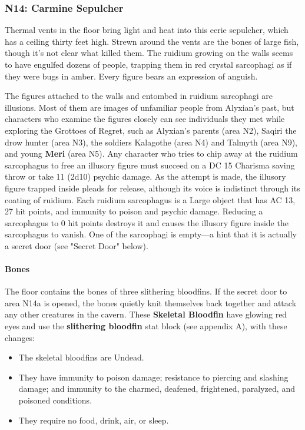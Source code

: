\documentclass[10pt,a4,twoside,twocolumn,openany,nodeprecatedcode]{dndbook}
\begin{document}
\subsubsection{N14: Carmine Sepulcher}
\begin{DndReadAloud}{}
Thermal vents in the floor bring light and heat into this eerie sepulcher, which has a ceiling thirty feet high. Strewn around the vents are the bones of large fish, though it's not clear what killed them.
The ruidium growing on the walls seems to have engulfed dozens of people, trapping them in red crystal sarcophagi as if they were bugs in amber. Every figure bears an expression of anguish.
\end{DndReadAloud}

The figures attached to the walls and entombed in ruidium sarcophagi are illusions. Most of them are images of unfamiliar people from Alyxian's past, but characters who examine the figures closely can see individuals they met while exploring the Grottoes of Regret, such as Alyxian's parents (area N2), Saqiri the drow hunter (area N3), the soldiers Kalagothe (area N4) and Talmyth (area N9), and young \textbf{Meri} (area N5). Any character who tries to chip away at the ruidium sarcophagus to free an illusory figure must succeed on a DC 15 Charisma saving throw or take 11 (2d10) psychic damage. As the attempt is made, the illusory figure trapped inside pleads for release, although its voice is indistinct through its coating of ruidium.
Each ruidium sarcophagus is a Large object that has AC 13, 27 hit points, and immunity to poison and psychic damage. Reducing a sarcophagus to 0 hit points destroys it and causes the illusory figure inside the sarcophagus to vanish.
One of the sarcophagi is empty—a hint that it is actually a secret door (see "Secret Door" below).
\paragraph{Bones}
The floor contains the bones of three slithering bloodfins. If the secret door to area N14a is opened, the bones quietly knit themselves back together and attack any other creatures in the cavern. These \textbf{Skeletal Bloodfin} have glowing red eyes and use the \textbf{slithering bloodfin} stat block (see appendix A), with these changes:
\begin{itemize}

\item The skeletal bloodfins are Undead.
\item They have immunity to poison damage; resistance to piercing and slashing damage; and immunity to the charmed, deafened, frightened, paralyzed, and poisoned conditions.
\item They require no food, drink, air, or sleep.
\end{itemize}
\end{document}
